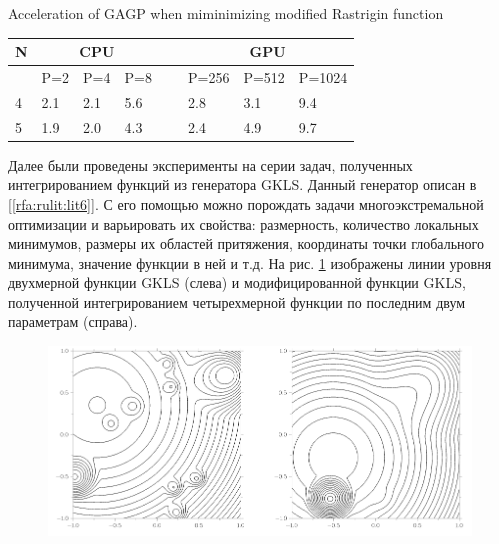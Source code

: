 \documentclass[10pt,a4paper]{book}
\begin{document}
\begin{table}[!ht]
    \centering
             {Acceleration of GAGP when miminimizing modified Rastrigin function}
    \label{table2}
    \begin{tabular}{|l|l|l|l|l|l|l|l|}
    \hline
        N &\multicolumn{3}{c|}{CPU} & ~ & \multicolumn{3}{c|}{GPU} \\ \hline
        ~ & P=2 & P=4 & P=8 & ~ & P=256 & P=512 & P=1024  \\ \hline
        4 & 2.1 & 2.1 & 5.6 & ~ & 2.8 & 3.1 & 9.4  \\ \hline
        5 & 1.9 & 2.0 & 4.3 & ~ & 2.4 & 4.9 & 9.7  \\ \hline
    \end{tabular}
\end{table}

Далее были проведены эксперименты на серии задач, полученных интегрированием функций из генератора GKLS. Данный генератор описан в [\ref{rfa:rulit:lit6}]. С его помощью можно порождать задачи многоэкстремальной оптимизации и варьировать их свойства: размерность, количество локальных минимумов, размеры их областей притяжения, координаты точки глобального минимума, значение функции в ней и т.д. На рис. \ref{fig:s3} изображены линии уровня двухмерной функции GKLS (слева) и модифицированной функции GKLS, полученной интегрированием четырехмерной функции по последним двум параметрам (справа).

\begin{figure}[!ht]
\begin{center}
  \includegraphics[width=1.0\linewidth]{./pic/s3.png}
  \label{fig:s3}  
\end{center}
\end{figure}
\end{document}
